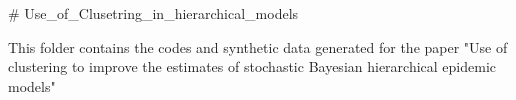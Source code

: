 # Use_of_Clusetring_in_hierarchical_models

This folder contains the codes and synthetic data generated for the paper "Use of clustering to improve the estimates of stochastic Bayesian
hierarchical epidemic models"

